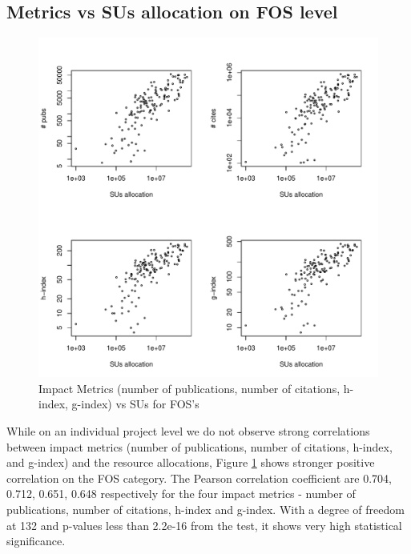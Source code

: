 \documentclass{sig-alternate}
\begin{document}
\subsection{Metrics vs SUs allocation on FOS level} 
 
\begin{figure}[!htb] 
  \centering 
    \includegraphics[width=1.0\columnwidth]{images/03_metrics_vs_alloc_fos.pdf} 
  \caption{Impact Metrics (number of publications, number of citations, h-index, g-index) vs SUs for FOS's}\label{F:metrics-vs-alloc-fos} 
\end{figure} 

While on an individual project level we do not observe strong correlations between impact metrics (number of publications, number of citations, h-index, and g-index) and the resource allocations, Figure \ref {F:metrics-vs-alloc-fos} shows stronger positive correlation on the FOS category. The Pearson correlation coefficient are 0.704, 0.712, 0.651, 0.648 respectively for the four impact metrics - number of publications, number of citations, h-index and g-index. With a degree of freedom at 132 and p-values less than 2.2e-16 from the test, it shows very high statistical significance.  
 
 
\end{document}
